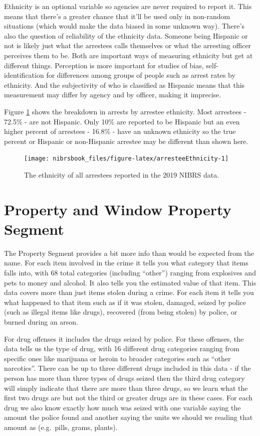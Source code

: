 \documentclass[
  12pt,
  openany]{book}
\begin{document}
Ethnicity is an optional variable so agencies are never required to report it. This means that there's a greater chance that it'll be used only in non-random situations (which would make the data biased in some unknown way). There's also the question of reliability of the ethnicity data. Someone being Hispanic or not is likely just what the arrestees calls themselves or what the arresting officer perceives them to be. Both are important ways of measuring ethnicity but get at different things. Perception is more important for studies of bias, self-identification for differences among groups of people such as arrest rates by ethnicity. And the subjectivity of who is classified as Hispanic means that this measurement may differ by agency and by officer, making it imprecise.

Figure \ref{fig:arresteeEthnicity} shows the breakdown in arrests by arrestee ethnicity. Most arrestees - 72.5\% - are not Hispanic. Only 10\% are reported to be Hispanic but an even higher percent of arrestees - 16.8\% - have an unknown ethnicity so the true percent or Hispanic or non-Hispanic arrestee may be different than shown here.

\begin{figure}

{\centering \texttt{[image: nibrsbook\_files/figure-latex/arresteeEthnicity-1]} 

}

\caption{The ethnicity of all arrestees reported in the 2019 NIBRS data.}\label{fig:arresteeEthnicity}
\end{figure}

\hypertarget{property}{%
\chapter{Property and Window Property Segment}\label{property}}

The Property Segment provides a bit more info than would be expected from the name. For each item involved in the crime it tells you what category that items falls into, with 68 total categories (including ``other'') ranging from explosives and pets to money and alcohol. It also tells you the estimated value of that item. This data covers more than just items stolen during a crime. For each item it tells you what happened to that item such as if it was stolen, damaged, seized by police (such as illegal items like drugs), recovered (from being stolen) by police, or burned during an arson.

For drug offenses it includes the drugs seized by police. For these offenses, the data tells us the type of drug, with 16 different drug categories ranging from specific ones like marijuana or heroin to broader categories such as ``other narcotics''. There can be up to three different drugs included in this data - if the person has more than three types of drugs seized then the third drug category will simply indicate that there are more than three drugs, so we learn what the first two drugs are but not the third or greater drugs are in these cases. For each drug we also know exactly how much was seized with one variable saying the amount the police found and another saying the units we should we reading that amount as (e.g.~pills, grams, plants).
\end{document}
